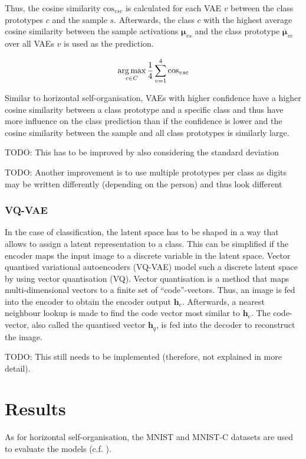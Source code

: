 Thus, the cosine similarity $\text{cos}_{vsc}$ is calculated for each VAE $v$ between the class prototypes $c$ and the sample $s$.
Afterwards, the class $c$ with the highest average cosine similarity between the sample activations $\boldsymbol{\mu}_{vs}$ and the class prototype $\boldsymbol{\overline{\mu}}_{vc}$ over all VAEs $v$ is used as the prediction.

\begin{align}\eqlbl{hso_14}
		\argmax_{c \in C} \frac{1}{4} \sum_{v=1}^{4} \text{cos}_{vsc}
\end{align}

Similar to horizontal self-organisation, VAEs with higher confidence have a higher cosine similarity between a class prototype and a specific class and thus have more influence on the class prediction than if the confidence is lower and the cosine similarity between the sample and all class prototypes is similarly large.

TODO: This has to be improved by also considering the standard deviation


TODO: Another improvement is to use multiple prototypes per class as digits may be written differently (depending on the person) and thus look different


\subsubsection{VQ-VAE}
In the case of classification, the latent space has to be shaped in a way that allows to assign a latent representation to a class.
This can be simplified if the encoder maps the input image to a discrete variable in the latent space.
Vector quantised variational autoencoders (VQ-VAE)  model such a discrete latent space by using vector quantisation (VQ).
Vector quantisation is a method that maps multi-dimensional vectors to a finite set of ``code''-vectors.
Thus, an image is fed into the encoder to obtain the encoder output $\boldsymbol{h}_e$.
Afterwards, a nearest neighbour lookup is made to find the code vector most similar to $\boldsymbol{h}_e$.
The code-vector, also called the quantised vector $\boldsymbol{h}_q$, is fed into the decoder to reconstruct the image.


TODO: This still needs to be implemented (therefore, not explained in more detail).


\section{Results}
As for horizontal self-organisation, the MNIST \cite{Lecun_Bottou_Bengio_Haffner_1998} and MNIST-C \cite{Mu_Gilmer_2019} datasets are used to evaluate the models (c.f. ). 

